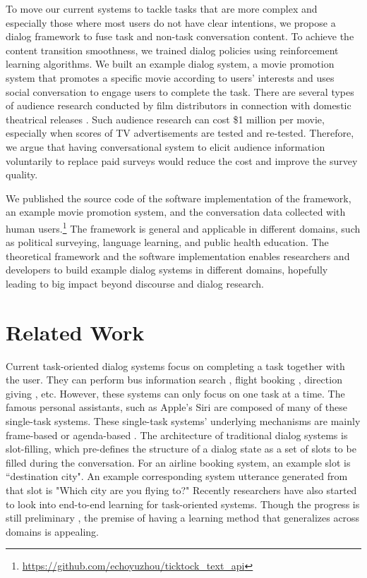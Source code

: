 \documentclass[11pt]{article}
\newcommand{\dk}[1]{{\color{red} #1}}
\begin{document}
To move our current systems to tackle tasks that are more complex and especially those where most users do not have clear intentions, we propose a dialog framework to fuse task and non-task conversation content. To achieve the content transition smoothness, we trained dialog policies using reinforcement learning algorithms. We built an example dialog system, a movie promotion system that promotes a specific movie according to users' interests and uses social conversation to engage users to complete the task. There are several types of audience research conducted by film distributors in connection with domestic theatrical releases \cite{martin1982}. Such audience research can cost \$1 million per movie, especially when scores of TV advertisements are tested and re-tested. Therefore, we argue that having conversational system to elicit audience information voluntarily to replace paid surveys would reduce the cost and improve the survey quality. 


We published the source code of the software implementation of the framework, an example movie promotion system, and the conversation data collected with human users.\footnote{\url{https://github.com/echoyuzhou/ticktock_text_api}}
The framework is general and applicable in different domains, such as political surveying, language learning, and public health education. The theoretical framework and the software implementation enables researchers and developers to build example dialog systems in different domains, hopefully leading to big impact beyond discourse and dialog research.

\section{Related Work}
Current task-oriented dialog systems focus on completing a task together with the user. They can perform bus information search \cite{raux2005let}, flight booking \cite{zue1994pegasus}, direction giving \cite{yu2015sigdial}, etc. However, these systems can only focus on one task at a time. The famous personal assistants, such as Apple's Siri are composed of many of these single-task systems. These single-task systems' underlying mechanisms are mainly frame-based or agenda-based \cite{rudnicky1999agenda}. %
The architecture of traditional dialog systems is slot-filling, which pre-defines the structure of a dialog state as a set of slots to be filled during the conversation. For an airline booking system, an example slot is ``destination city". An example corresponding system utterance generated from that slot is "Which city are you flying to?" Recently researchers have also started to look into end-to-end learning for task-oriented systems. Though the progress is still preliminary \cite{bordes2016learning}, the premise of having a learning method that generalizes across domains is appealing. 
\end{document}
